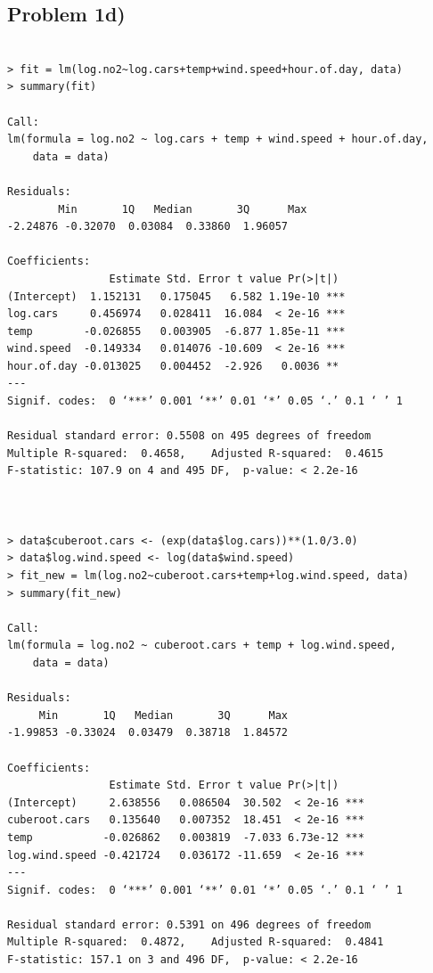 \documentclass[a4paper, twocolumn]{article}
\begin{document}
\subsection*{Problem 1d)}
\begin{Verbatim}[fontsize=\footnotesize]

> fit = lm(log.no2~log.cars+temp+wind.speed+hour.of.day, data)
> summary(fit)

Call:
lm(formula = log.no2 ~ log.cars + temp + wind.speed + hour.of.day, 
    data = data)

Residuals:
        Min       1Q   Median       3Q      Max 
-2.24876 -0.32070  0.03084  0.33860  1.96057 

Coefficients:
                Estimate Std. Error t value Pr(>|t|)    
(Intercept)  1.152131   0.175045   6.582 1.19e-10 ***
log.cars     0.456974   0.028411  16.084  < 2e-16 ***
temp        -0.026855   0.003905  -6.877 1.85e-11 ***
wind.speed  -0.149334   0.014076 -10.609  < 2e-16 ***
hour.of.day -0.013025   0.004452  -2.926   0.0036 ** 
---
Signif. codes:  0 ‘***’ 0.001 ‘**’ 0.01 ‘*’ 0.05 ‘.’ 0.1 ‘ ’ 1

Residual standard error: 0.5508 on 495 degrees of freedom
Multiple R-squared:  0.4658,	Adjusted R-squared:  0.4615 
F-statistic: 107.9 on 4 and 495 DF,  p-value: < 2.2e-16



> data$cuberoot.cars <- (exp(data$log.cars))**(1.0/3.0)
> data$log.wind.speed <- log(data$wind.speed)
> fit_new = lm(log.no2~cuberoot.cars+temp+log.wind.speed, data)
> summary(fit_new)

Call:
lm(formula = log.no2 ~ cuberoot.cars + temp + log.wind.speed, 
    data = data)

Residuals:
     Min       1Q   Median       3Q      Max 
-1.99853 -0.33024  0.03479  0.38718  1.84572 

Coefficients:
                Estimate Std. Error t value Pr(>|t|)    
(Intercept)     2.638556   0.086504  30.502  < 2e-16 ***
cuberoot.cars   0.135640   0.007352  18.451  < 2e-16 ***
temp           -0.026862   0.003819  -7.033 6.73e-12 ***
log.wind.speed -0.421724   0.036172 -11.659  < 2e-16 ***
---
Signif. codes:  0 ‘***’ 0.001 ‘**’ 0.01 ‘*’ 0.05 ‘.’ 0.1 ‘ ’ 1

Residual standard error: 0.5391 on 496 degrees of freedom
Multiple R-squared:  0.4872,	Adjusted R-squared:  0.4841 
F-statistic: 157.1 on 3 and 496 DF,  p-value: < 2.2e-16


\end{Verbatim}
\end{document}
